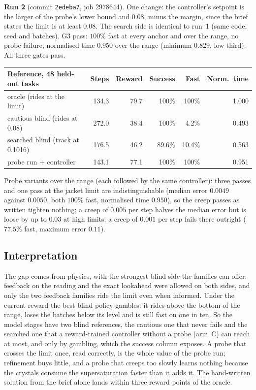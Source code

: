 \documentclass[11pt,a4paper]{article}
\begin{document}
\textbf{Run 2} (commit \texttt{2edeba7}, job 2978644). One change: the
controller's setpoint is the larger of the probe's lower bound and $0.08$,
minus the margin, since the brief states the limit is at least $0.08$. The
search side is identical to run~1 (same code, seed and batches). G3 pass:
$100\%$ fast at every anchor and over the range, no probe failure, normalised
time $0.950$ over the range (minimum $0.829$, low third). All three gates
pass.

\begin{center}\small
\begin{tabular}{@{}lrrrrr@{}}
\toprule
Reference, 48 held-out tasks & Steps & Reward & Success & Fast & Norm.\ time \\
\midrule
oracle (rides at the limit) & 134.3 & 79.7 & 100\% & 100\% & 1.000 \\
cautious blind (rides at 0.08) & 272.0 & 38.4 & 100\% & 4.2\% & 0.493 \\
searched blind (track at 0.1016) & 176.5 & 46.2 & 89.6\% & 10.4\% & 0.563 \\
probe run + controller & 143.1 & 77.1 & 100\% & 100\% & 0.951 \\
\bottomrule
\end{tabular}
\end{center}

Probe variants over the range (each followed by the same controller): three
passes and one pass at the jacket limit are indistinguishable (median error
$0.0049$ against $0.0050$, both $100\%$ fast, normalised time $0.950$), so the
creep passes as written tighten nothing; a creep of $0.005$ per step halves
the median error but is loose by up to $0.03$ at high limits; a creep of
$0.001$ per step fails there outright ($77.5\%$ fast, maximum error $0.11$).

\subsection*{Interpretation}

The gap comes from physics, with the strongest blind side the families can
offer: feedback on the reading and the exact lookahead were allowed on both
sides, and only the two feedback families ride the limit even when informed.
Under the current reward the best blind policy gambles: it rides above the
bottom of the range, loses the batches below its level and is still fast on
one in ten. So the model stages have two blind references, the cautious one
that never fails and the searched one that a reward-trained controller
without a probe (arm~C) can reach at most, and only by gambling, which the
success column exposes. A probe that crosses the limit once, read correctly,
is the whole value of the probe run; refinement buys little, and a probe that
creeps too slowly learns nothing because the crystals consume the
supersaturation faster than it adds it. The hand-written solution from the
brief alone lands within three reward points of the oracle.
\end{document}
